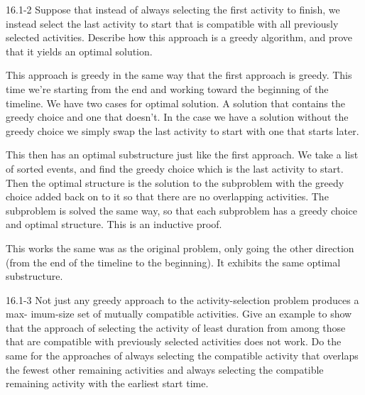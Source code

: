 \begin{problem}{16.1-2}
  Suppose that instead of always selecting the first activity to finish, we instead select the last activity to start
  that is compatible with all previously selected activities. Describe how this approach is a greedy algorithm, and
  prove that it yields an optimal solution.
  \begin{solution}
    This approach is greedy in the same way that the first approach is greedy. This time we're starting from the end and
    working toward the beginning of the timeline. We have two cases for optimal solution. A solution that contains the
    greedy choice and one that doesn't. In the case we have a solution without the greedy choice we simply swap the last
    activity to start with one that starts later.

    This then has an optimal substructure just like the first approach. We take a list of sorted events, and find the
    greedy choice which is the last activity to start. Then the optimal structure is the solution to the subproblem with
    the greedy choice added back on to it so that there are no overlapping activities. The subproblem is solved the same
    way, so that each subproblem has a greedy choice and optimal structure. This is an inductive proof.

    This works the same was as the original problem, only going the other direction (from the end of the timeline to the
    beginning). It exhibits the same optimal substructure.
  \end{solution}
\end{problem}

\begin{problem}{16.1-3}
  Not just any greedy approach to the activity-selection problem produces a max- imum-size set of mutually compatible
  activities. Give an example to show that the approach of selecting the activity of least duration from among those
  that are compatible with previously selected activities does not work. Do the same for the approaches of always
  selecting the compatible activity that overlaps the fewest other remaining activities and always selecting the
  compatible remaining activity with the earliest start time.
\end{problem}


